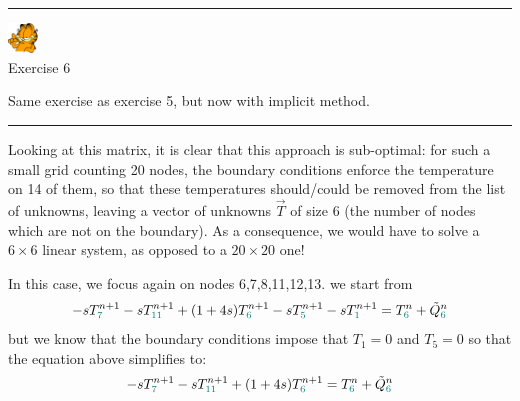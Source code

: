 \begin{center}
\begin{minipage}[t]{0.77\textwidth}
\par\noindent\rule{\textwidth}{0.4pt}
\begin{center}
\includegraphics[width=0.8cm]{images/garftr} \\
{\color{orange}Exercise 6}
\end{center}

Same exercise as exercise 5, but now with implicit method.

\par\noindent\rule{\textwidth}{0.4pt}
\end{minipage}
\end{center}


Looking at this matrix, it is clear that this approach is sub-optimal: for such a small grid counting
20 nodes, the boundary conditions enforce the temperature on 14 of them, so that these
temperatures should/could be removed from the list of unknowns, leaving a vector 
of unknowns $\vec{T}$ of size 6 (the number of nodes which are not on the boundary).
As a consequence, we would have to solve a $6\times 6$ linear system, as opposed to a $20\times 20$ one!

In this case, we focus again on nodes 6,7,8,11,12,13.
we start from 
\begin{equation}
-s T_{{\color{teal} 7}}^{n+1}
-s T_{{\color{teal} 11}}^{n+1} 
+(1+4s)T_{{\color{teal} 6}}^{n+1} 
-s T_{{\color{teal} 5}}^{n+1} 
-s T_{{\color{teal} 1}}^{n+1} 
= T_{{\color{teal} 6}}^n 
+\tilde{Q}_{{\color{teal} 6}}^n
\end{equation}
but we know that the boundary conditions impose that $T_1=0$ and $T_5=0$ so that the equation above simplifies to:
\begin{equation}
-s T_{{\color{teal} 7}}^{n+1}
-s T_{{\color{teal} 11}}^{n+1} 
+(1+4s)T_{{\color{teal} 6}}^{n+1} 
= T_{{\color{teal} 6}}^n 
+\tilde{Q}_{{\color{teal} 6}}^n
\end{equation}

